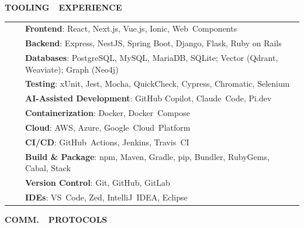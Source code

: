 \documentclass[a4paper,11pt,english]{article}
\newcommand{\LeftColumn}[0]{6.0cm}
\newcommand{\RightColumn}[0]{10.5cm}
\newcommand{\ItemSkip}[0]{4pt}
\newcommand{\SubItemSkip}[0]{0pt}
\newcommand{\ToolCategory}[1]{\textbf{#1}}
\newcommand{\Bullet}[0]{\faCaretRight~~}
\newcommand{\BeginSubRubricSkip}[0]{6pt}
\newcommand{\EndSubRubric}[0]{\vspace{4pt}}
\newcommand{\Rubric}[1]{\colorbox{gray!20}{\parbox{\linewidth}{\centering\sffamily\bfseries{}#1}}}
\newcommand{\SubRubric}[1]{\parbox{\linewidth}{\sffamily\bfseries{}#1}}
\begin{document}
\begin{minipage}[t]{\RightColumn}

\end{minipage}

\newpage

\begin{minipage}[t]{\LeftColumn}

\Rubric{\faTools \quad TOOLING~~EXPERIENCE}\vspace{8pt}

\begin{tabularx}{\linewidth}{@{}l@{}>{\raggedright\arraybackslash}X@{}}
\Bullet & \ToolCategory{Frontend}: React, Next.js, Vue.js, Ionic, Web~Components \\[0pt]
\Bullet & \ToolCategory{Backend}: Express, NestJS, Spring Boot, Django, Flask, Ruby on Rails \\[0pt]
\Bullet & \ToolCategory{Databases}: PostgreSQL, MySQL, MariaDB, SQLite; Vector (Qdrant, Weaviate); Graph (Neo4j) \\[0pt]
\Bullet & \ToolCategory{Testing}: xUnit, Jest, Mocha, QuickCheck, Cypress, Chromatic, Selenium \\[0pt]
\Bullet & \ToolCategory{AI-Assisted Development}: GitHub Copilot, Claude~Code, Pi.dev \\[0pt]
\Bullet & \ToolCategory{Containerization}: Docker, Docker~Compose \\[0pt]
\Bullet & \ToolCategory{Cloud}: AWS, Azure, Google~Cloud~Platform \\[0pt]
\Bullet & \ToolCategory{CI/CD}: GitHub~Actions, Jenkins, Travis~CI \\[0pt]
\Bullet & \ToolCategory{Build \& Package}: npm, Maven, Gradle, pip, Bundler, RubyGems, Cabal, Stack \\[0pt]
\Bullet & \ToolCategory{Version Control}: Git, GitHub, GitLab \\[0pt]
\Bullet & \ToolCategory{IDEs}: VS~Code, Zed, IntelliJ~IDEA, Eclipse \\[0pt]
\end{tabularx}

\vspace{12pt}\Rubric{\faNetworkWired \quad COMM.~~PROTOCOLS}\vspace{8pt}


\end{minipage}
\end{document}
